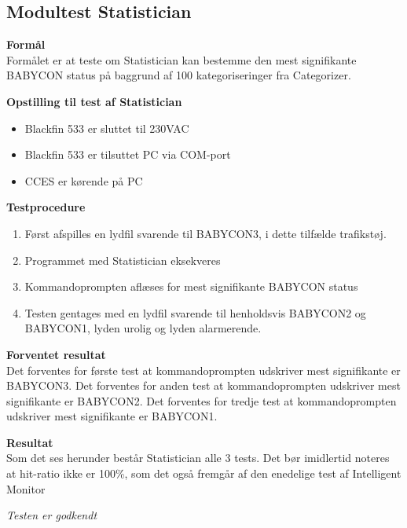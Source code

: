 \subsection{Modultest Statistician}

\textbf{Formål} \\
Formålet er at teste om Statistician kan bestemme den mest signifikante BABYCON status på baggrund af 100 kategoriseringer fra Categorizer.

\textbf{Opstilling til test af Statistician}

\begin{itemize}
	\item Blackfin 533 er sluttet til 230VAC
	\item Blackfin 533 er tilsuttet PC via COM-port
	\item CCES er kørende på PC
\end{itemize}

\textbf{Testprocedure}
\begin{enumerate}
	\item Først afspilles en lydfil svarende til BABYCON3, i dette tilfælde trafikstøj.
	\item Programmet med Statistician eksekveres 
	\item Kommandoprompten aflæses for mest signifikante BABYCON status
	\item Testen gentages med en lydfil svarende til henholdsvis BABYCON2 og BABYCON1, lyden urolig og lyden alarmerende. 
\end{enumerate}

\textbf{Forventet resultat} \\
Det forventes for første test at kommandoprompten udskriver mest signifikante er BABYCON3.
Det forventes for anden test at kommandoprompten udskriver mest signifikante er BABYCON2.
Det forventes for tredje test at kommandoprompten udskriver mest signifikante er BABYCON1. 

\textbf{Resultat} \\
Som det ses herunder består Statistician alle 3 tests. Det bør imidlertid noteres at hit-ratio ikke er 100\%, som det også fremgår af den enedelige test af Intelligent Monitor


\textit{Testen er godkendt}